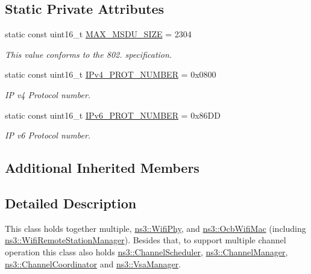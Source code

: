 \subsection*{Static Private Attributes}
\begin{DoxyCompactItemize}
\item 
static const uint16\+\_\+t \hyperlink{classns3_1_1WaveNetDevice_a657b84535129c4bf94fb6720d5052508}{M\+A\+X\+\_\+\+M\+S\+D\+U\+\_\+\+S\+I\+ZE} = 2304
\begin{DoxyCompactList}\small\item\em This value conforms to the 802. specification. \end{DoxyCompactList}\item 
static const uint16\+\_\+t \hyperlink{classns3_1_1WaveNetDevice_aea82cd6718f17f1d2e585c23e4d76100}{I\+Pv4\+\_\+\+P\+R\+O\+T\+\_\+\+N\+U\+M\+B\+ER} = 0x0800
\begin{DoxyCompactList}\small\item\em IP v4 Protocol number. \end{DoxyCompactList}\item 
static const uint16\+\_\+t \hyperlink{classns3_1_1WaveNetDevice_a8b18e42ab92375ead7121c02c79e802f}{I\+Pv6\+\_\+\+P\+R\+O\+T\+\_\+\+N\+U\+M\+B\+ER} = 0x86\+DD
\begin{DoxyCompactList}\small\item\em IP v6 Protocol number. \end{DoxyCompactList}\end{DoxyCompactItemize}
\subsection*{Additional Inherited Members}


\subsection{Detailed Description}
This class holds together multiple, \hyperlink{classns3_1_1WifiPhy}{ns3\+::\+Wifi\+Phy}, and \hyperlink{classns3_1_1OcbWifiMac}{ns3\+::\+Ocb\+Wifi\+Mac} (including \hyperlink{classns3_1_1WifiRemoteStationManager}{ns3\+::\+Wifi\+Remote\+Station\+Manager}). Besides that, to support multiple channel operation this class also holds \hyperlink{classns3_1_1ChannelScheduler}{ns3\+::\+Channel\+Scheduler}, \hyperlink{classns3_1_1ChannelManager}{ns3\+::\+Channel\+Manager}, \hyperlink{classns3_1_1ChannelCoordinator}{ns3\+::\+Channel\+Coordinator} and \hyperlink{classns3_1_1VsaManager}{ns3\+::\+Vsa\+Manager}.

